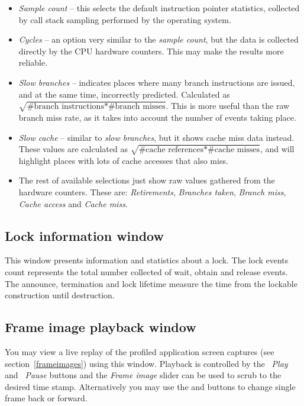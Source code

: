 \documentclass[hidelinks,titlepage,a4paper]{article}
\begin{document}
\begin{itemize}
\item \emph{Sample count} -- this selects the default instruction pointer statistics, collected by call stack sampling performed by the operating system.
\item \emph{Cycles} -- an option very similar to the \emph{sample count}, but the data is collected directly by the CPU hardware counters. This may make the results more reliable.
\item \emph{Slow branches} -- indicates places where many branch instructions are issued, and at the same time, incorrectly predicted. Calculated as $\sqrt{\text{\#branch instructions}*\text{\#branch misses}}$. This is more useful than the raw branch miss rate, as it takes into account the number of events taking place.
\item \emph{Slow cache} -- similar to \emph{slow branches}, but it shows cache miss data instead. These values are calculated as $\sqrt{\text{\#cache references}*\text{\#cache misses}}$, and will highlight places with lots of cache accesses that also miss.
\item The rest of available selections just show raw values gathered from the hardware counters. These are: \emph{Retirements}, \emph{Branches taken}, \emph{Branch miss}, \emph{Cache access} and \emph{Cache miss}.
\end{itemize}

\subsection{Lock information window}
\label{lockwindow}

This window presents information and statistics about a lock. The lock events count represents the total number collected of wait, obtain and release events. The announce, termination and lock lifetime measure the time from the lockable construction until destruction.

\subsection{Frame image playback window}
\label{playback}

You may view a live replay of the profiled application screen captures (see section~\ref{frameimages}) using this window. Playback is controlled by the \emph{\faPlay~Play} and \emph{\faPause~Pause} buttons and the \emph{Frame image} slider can be used to scrub to the desired time stamp. Alternatively you may use the \emph{\faCaretLeft} and \emph{\faCaretRight} buttons to change single frame back or forward.
\end{document}
